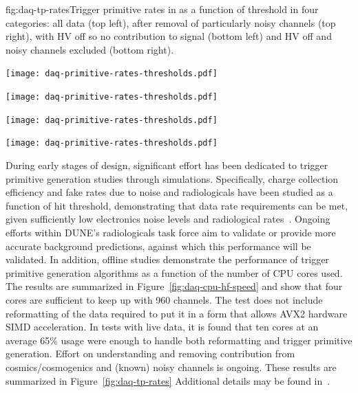 \begin{dunefigure}{fig:daq-tp-rates}{Trigger primitive rates in  as a function of threshold in four categories: all data (top left),  after removal of particularly noisy channels (top right), with HV off so no contribution to signal (bottom left) and HV off and noisy channels excluded (bottom right).}
  \begin{minipage}[b]{0.5\linewidth}
    \begin{center}
     \texttt{[image: daq-primitive-rates-thresholds.pdf]}

     \texttt{[image: daq-primitive-rates-thresholds.pdf]}
    \end{center}
  \end{minipage}%
  \begin{minipage}[b]{0.5\linewidth}
    \begin{center}
     \texttt{[image: daq-primitive-rates-thresholds.pdf]}

     \texttt{[image: daq-primitive-rates-thresholds.pdf]}
    \end{center}
  \end{minipage}

\end{dunefigure}


During early stages of design, significant effort has been dedicated to
trigger primitive generation studies through simulations.
Specifically, charge collection efficiency and fake rates due to noise
and radiologicals have been studied as a function of hit threshold,
demonstrating that data rate requirements can be met, given sufficiently low
electronics noise levels and radiological rates~\cite{bib:docdb11236}. 
Ongoing efforts within DUNE's radiologicals task force aim to validate
or provide more accurate background predictions, against which this
performance will be validated.
In addition, offline studies demonstrate the performance of trigger
primitive generation algorithms as a function of the number of CPU cores
used.  
The results are summarized in Figure~\ref{fig:daq-cpu-hf-speed} and show
that four cores are sufficient to keep up with 960 channels.
The test does not include reformatting of the data required to put it in
a form that allows AVX2 hardware SIMD acceleration.
In tests with live  data, it is found that ten cores at
an average 65\% usage were enough to handle both reformatting and
trigger primitive generation. 
Effort on understanding and removing contribution
from cosmics/cosmogenics and (known) noisy channels is ongoing.
These results are summarized in Figure~\ref{fig:daq-tp-rates}
Additional details may be found in~.

